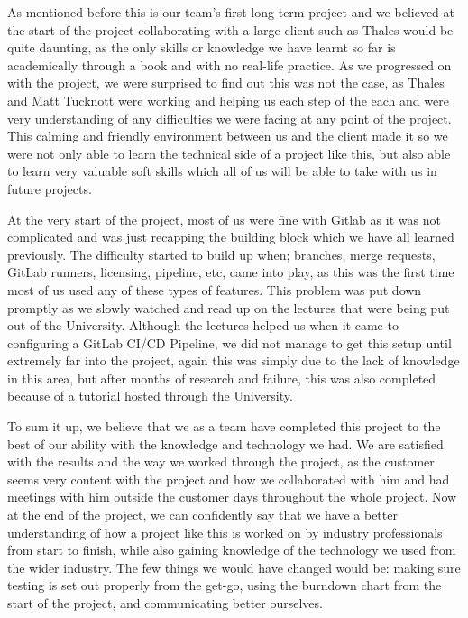 \documentclass{l3proj}
\begin{document}
As mentioned before this is our team’s first long-term project and we believed at the start of the project collaborating with a large client such as Thales would be quite daunting, as the only skills or knowledge we have learnt so far is academically through a book and with no real-life practice. As we progressed on with the project, we were surprised to find out this was not the case, as Thales and Matt Tucknott were working and helping us each step of the each and were very understanding of any difficulties we were facing at any point of the project. This calming and friendly environment between us and the client made it so we were not only able to learn the technical side of a project like this, but also able to learn very valuable soft skills which all of us will be able to take with us in future projects.

At the very start of the project, most of us were fine with Gitlab as it was not complicated and was just recapping the building block which we have all learned previously. The difficulty started to build up when; branches, merge requests, GitLab runners, licensing, pipeline, etc, came into play, as this was the first time most of us used any of these types of features. This problem was put down promptly as we slowly watched and read up on the lectures that were being put out of the University. Although the lectures helped us when it came to configuring a GitLab CI/CD Pipeline, we did not manage to get this setup until extremely far into the project, again this was simply due to the lack of knowledge in this area, but after months of research and failure, this was also completed because of a tutorial hosted through the University.

To sum it up, we believe that we as a team have completed this project to the best of our ability with the knowledge and technology we had. We are satisfied with the results and the way we worked through the project, as the customer seems very content with the project and how we collaborated with him and had meetings with him outside the customer days throughout the whole project. Now at the end of the project, we can confidently say that we have a better understanding of how a project like this is worked on by industry professionals from start to finish, while also gaining knowledge of the technology we used from the wider industry. The few things we would have changed would be: making sure testing is set out properly from the get-go, using the burndown chart from the start of the project, and communicating better ourselves.



\end{document}

